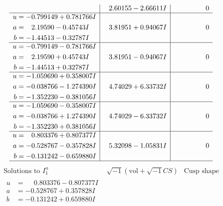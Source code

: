 \documentclass[1p]{elsarticle_modified}
\theoremstyle{definition}
\newcommand{\I}{\sqrt{-1}}
\begin{document}
$$\begin{array}{c|c|c}
 & \phantom{-}2.60155 - 2.66611 I & \phantom{-0.000000 } 0 \\ \hline\begin{aligned}
u &= -0.799149 + 0.781766 I \\
a &= \phantom{-}2.19590 - 0.45743 I \\
b &= -1.44513 - 0.32787 I\end{aligned}
 & \phantom{-}3.81951 + 0.94067 I & \phantom{-0.000000 } 0 \\ \hline\begin{aligned}
u &= -0.799149 - 0.781766 I \\
a &= \phantom{-}2.19590 + 0.45743 I \\
b &= -1.44513 + 0.32787 I\end{aligned}
 & \phantom{-}3.81951 - 0.94067 I & \phantom{-0.000000 } 0 \\ \hline\begin{aligned}
u &= -1.059690 + 0.358007 I \\
a &= -0.038766 - 1.274390 I \\
b &= -1.352230 - 0.381056 I\end{aligned}
 & \phantom{-}4.74029 + 6.33732 I & \phantom{-0.000000 } 0 \\ \hline\begin{aligned}
u &= -1.059690 - 0.358007 I \\
a &= -0.038766 + 1.274390 I \\
b &= -1.352230 + 0.381056 I\end{aligned}
 & \phantom{-}4.74029 - 6.33732 I & \phantom{-0.000000 } 0 \\ \hline\begin{aligned}
u &= \phantom{-}0.803376 + 0.807377 I \\
a &= -0.528767 - 0.357828 I \\
b &= -0.131242 - 0.659880 I\end{aligned}
 & \phantom{-}5.32098 - 1.05831 I & \phantom{-0.000000 } 0\\
 \hline 
 \end{array}$$\newpage$$\begin{array}{c|c|c}  
\text{Solutions to }I^u_{1}& \I (\text{vol} + \sqrt{-1}CS) & \text{Cusp shape}\\
 \hline 
\begin{aligned}
u &= \phantom{-}0.803376 - 0.807377 I \\
a &= -0.528767 + 0.357828 I \\
b &= -0.131242 + 0.659880 I\end{aligned}

\end{array}$$
\end{document}
